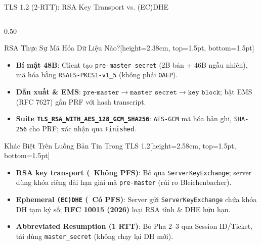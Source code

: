 \documentclass[aspectratio=169, 10pt]{beamer}
\begin{document}
\begin{frame}{TLS 1.2 (2-RTT): RSA Key Transport vs. (EC)DHE}
\begin{columns}[T]
		\begin{column}{0.50\textwidth}
			\begin{accentcard}[uetblue]{RSA Thực Sự Mã Hóa Dữ Liệu Nào?}[height=2.38cm, top=1.5pt, bottom=1.5pt]
				\setlength{\leftmargini}{10pt}
				\begin{itemize}\setlength{\itemsep}{0.35pt}\setlength{\topsep}{0pt}\setlength{\parsep}{0pt}\fontsize{6.0pt}{7.2pt}\selectfont
					\item \textbf{Bí mật 48B}: Client tạo \texttt{pre-master secret} (2B bản + 46B ngẫu nhiên), mã hóa bằng \texttt{RSAES-PKCS1-v1\_5} (không phải \texttt{OAEP}).
					\item \textbf{Dẫn xuất \& EMS}: $\texttt{pre-master} \rightarrow \texttt{master secret} \rightarrow \texttt{key block}$; bật EMS (RFC 7627) gắn PRF với hash transcript.
					\item \textbf{Suite \texttt{TLS\_RSA\_WITH\_AES\_128\_GCM\_SHA256}}: \texttt{AES-GCM} mã hóa bản ghi, \texttt{SHA-256} cho PRF; xác nhận qua \texttt{Finished}.
				\end{itemize}
			\end{accentcard}
			\vspace{0.08cm}
			\begin{accentcard}[uetblue]{Khác Biệt Trên Luồng Bản Tin Trong TLS 1.2}[height=2.58cm, top=1.5pt, bottom=1.5pt]
				\setlength{\leftmargini}{10pt}
				\begin{itemize}\setlength{\itemsep}{0.35pt}\setlength{\topsep}{0pt}\setlength{\parsep}{0pt}\fontsize{6.0pt}{7.2pt}\selectfont
					\item \textbf{RSA key transport (\xmark\ Không PFS)}: Bỏ qua \texttt{ServerKeyExchange}; server dùng khóa riêng dài hạn giải mã \texttt{pre-master} (rủi ro Bleichenbacher).
					\item \textbf{Ephemeral \texttt{(EC)DHE} (\cmark\ Có PFS)}: Server gửi \texttt{ServerKeyExchange} chứa khóa DH tạm ký số; \textbf{RFC 10015 (2026)} loại RSA tĩnh \& DHE hữu hạn.
					\item \textbf{Abbreviated Resumption (1 RTT)}: Bỏ Pha 2--3 qua Session ID/Ticket, tái dùng \texttt{master\_secret} (không chạy lại DH mới).
				\end{itemize}
			\end{accentcard}
		\end{column}
	\end{columns}
\end{frame}
\end{document}
